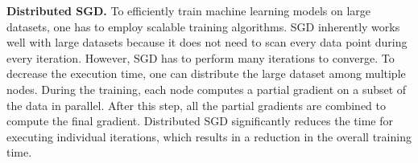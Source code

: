 \textbf{Distributed SGD.}
To efficiently train machine learning models on large datasets, one has to employ scalable training algorithms.
SGD inherently works well with large datasets because it does not need to scan every data point during every iteration.
However, SGD has to perform many iterations to converge.
To decrease the execution time, one can distribute the large dataset among multiple nodes.
During the training, each node computes a partial gradient on a subset of the data in parallel.
After this step, all the partial gradients are combined to compute the final gradient.
Distributed SGD significantly reduces the time for executing individual iterations, which results in a reduction in the overall training time.
